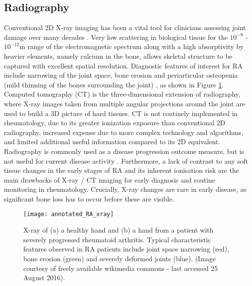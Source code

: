 \documentclass[twoside]{bhamthesis}
\theoremstyle{definition}
\begin{document}

\subsection{Radiography}

Conventional 2D X-ray imaging has been a vital tool for clinicians assessing joint damage over many decades \cite{van1996plain}. Very low scattering in biological tissue for the $10^{-9}$ - $10^{-12}$m range of the electromagnetic spectrum along with a high absorptivity by heavier elements, namely calcium in the bone, allows skeletal structure to be captured with excellent spatial resolution. Diagnostic features of interest for RA include narrowing of the joint space, bone erosion and periarticular osteopenia (mild thinning of the bones surrounding the joint) \cite{jacobson2008radiographic}, as shown in Figure \ref{fig:XRAY}. Computed tomography (CT) is the three-dimensional extension of radiography, where X-ray images taken from multiple angular projections around the joint are used to build a 3D picture of hard tissues. CT is not routinely implemented in rheumatology, due to its greater ionization exposure than conventional 2D radiography, increased expense due to more complex technology and algorithms, and limited additional useful information compared to its 2D equivalent. Radiography is commonly used as a disease progression outcome measure, but is not useful for current disease activity \cite{backhaus1999arthritis}. Furthermore, a lack of contrast to any soft tissue changes in the early stages of RA and its inherent ionisation risk are the main drawbacks of X-ray / CT imaging for early diagnosis and routine monitoring in rheumatology. Crucially, X-ray changes are rare in early disease, as significant bone loss has to occur before these are visible.

\begin{figure}[!ht]
\centering
  \texttt{[image: annotated\_RA\_xray]}
\caption{X-ray of (a) a healthy hand and (b) a hand from a patient with severely progressed rheumatoid arthritis. Typical characteristic features observed in RA patients include joint space narrowing (red), bone erosion (green) and severely deformed joints (blue). (Image courtesy of freely available wikimedia commons - last accessed 25 August 2016).}
  \label{fig:XRAY}
\end{figure}
\end{document}
